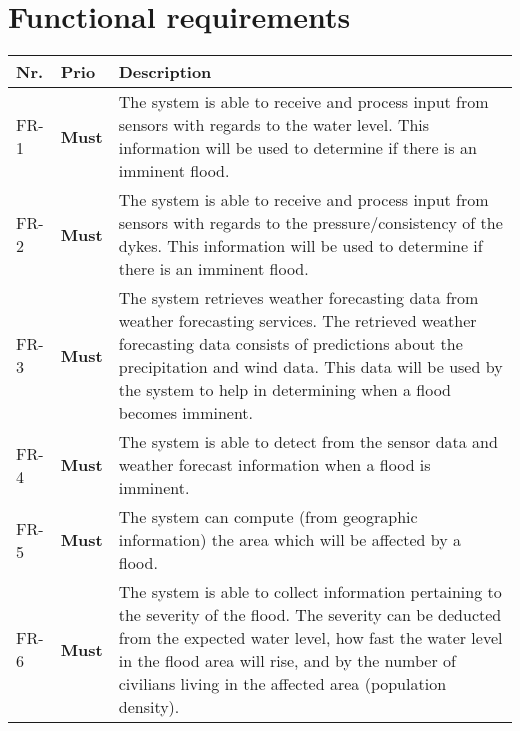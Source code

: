 \section{Functional requirements}
\begin{longtable}{p{} p{} p{}}
    \textbf{Nr.} & \textbf{Prio}  & \textbf{Description} \\
    
    \hline {} \label{fr:1} FR-1 & 
      \textbf{Must} &
      The system is able to receive and process input from sensors with regards to the water level. This information will be used to determine if there is an imminent flood. \\
    
    \hline {} \label{fr:2} FR-2 & 
      \textbf{Must} &
      The system is able to receive and process input from sensors with regards to the pressure/consistency of the dykes. This information will be used to determine if there is an imminent flood. \\
    
    \hline {} \label{fr:3} FR-3 & 
      \textbf{Must} &
      The system retrieves weather forecasting data from weather forecasting services. The retrieved weather forecasting data consists of predictions about the precipitation and wind data. This data will be used by the system to help in determining when a flood becomes imminent.
     \\
     
    \hline {} \label{fr:4} FR-4 & 
      \textbf{Must} &
      The system is able to detect from the sensor data and weather forecast information when a flood is imminent. \\ %
    
    \hline {} \label{fr:5} FR-5 & 
      \textbf{Must} &
     The system can compute (from geographic information) the area which will be affected by a flood. \\
    
    \hline {} \label{fr:6} FR-6 & 
      \textbf{Must} &
     The system is able to collect information pertaining to the severity of the flood. The severity can be deducted from the expected water level, how fast the water level in the flood area will rise, and by the number of civilians living in the affected area (population density). \\
    

\end{longtable}
